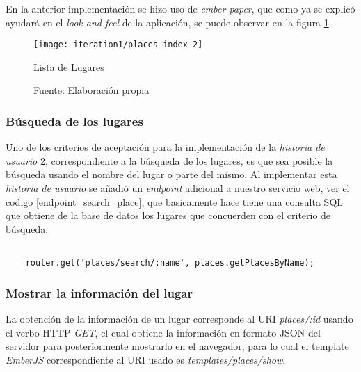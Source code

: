 En la anterior implementación se hizo uso de \emph{ember-paper}, que como ya se explicó ayudará en el \emph{look and feel} de la aplicación, se puede observar en la figura \ref{fig:places_index}. \\


\begin{figure}[H]
  \begin{center}
    \texttt{[image: iteration1/places\_index\_2]}
    \caption{Lista de Lugares}
    \label{fig:places_index}
    \caption*{Fuente: Elaboración propia}
  \end{center}
\end{figure}


\subsubsection{Búsqueda de los lugares}
\label{subs:busqueda de los lugares}

Uno de los criterios de aceptación para la implementación de la \emph{historia de usuario} 2, correspondiente a la búsqueda de los lugares, es que sea posible la búsqueda usando el nombre del lugar o parte del mismo. Al implementar esta \emph{historia de usuario} se a\~nadi\'o un \emph{endpoint} adicional a nuestro servicio web, ver el codigo \ref{endpoint_search_place}, que basicamente hace tiene una consulta SQL que obtiene de la base de datos los lugares que concuerden con el criterio de búsqueda. \\

\begin{center}
  \begin{lstlisting}[label=endpoint_search_place,caption=Implementación de la búsqueda de lugares en el Servicio Web]

    router.get('places/search/:name', places.getPlacesByName);

  \end{lstlisting}
\end{center}


\subsubsection{Mostrar la información del lugar}
\label{subs:Mostrar información del lugar}

La obtención de la información de un lugar corresponde al URI \emph{places/:id} usando el verbo HTTP \emph{GET}, el cual obtiene la información en formato JSON del servidor para posteriormente mostrarlo en el navegador, para lo cual el template \emph{EmberJS} correspondiente al URI usado es \emph{templates/places/show}. \\

